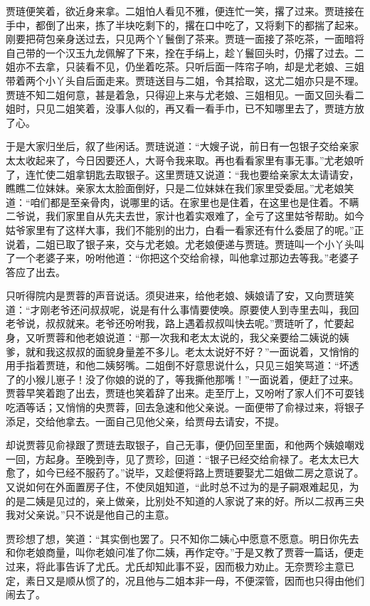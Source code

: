 \documentclass[12pt,oneside]{book}
\begin{document}
贾琏便笑着，欲近身来拿。二姐怕人看见不雅，便连忙一笑，撂了过来。贾琏接在手中，都倒了出来，拣了半块吃剩下的，撂在口中吃了，又将剩下的都揣了起来。刚要把荷包亲身送过去，只见两个丫鬟倒了茶来。贾琏一面接了茶吃茶，一面暗将自己带的一个汉玉九龙佩解了下来，拴在手绢上，趁丫鬟回头时，仍撂了过去。二姐亦不去拿，只装看不见，仍坐着吃茶。只听后面一阵帘子响，却是尤老娘、三姐带着两个小丫头自后面走来。贾琏送目与二姐，令其拾取，这尤二姐亦只是不理。贾琏不知二姐何意，甚是着急，只得迎上来与尤老娘、三姐相见。一面又回头看二姐时，只见二姐笑着，没事人似的，再又看一看手巾，已不知哪里去了，贾琏方放了心。

于是大家归坐后，叙了些闲话。贾琏说道：“大嫂子说，前日有一包银子交给亲家太太收起来了，今日因要还人，大哥令我来取。再也看看家里有事无事。”尤老娘听了，连忙使二姐拿钥匙去取银子。这里贾琏又说道：“我也要给亲家太太请请安，瞧瞧二位妹妹。亲家太太脸面倒好，只是二位妹妹在我们家里受委屈。”尤老娘笑道：“咱们都是至亲骨肉，说哪里的话。在家里也是住着，在这里也是住着。不瞒二爷说，我们家里自从先夫去世，家计也着实艰难了，全亏了这里姑爷帮助。如今姑爷家里有了这样大事，我们不能别的出力，白看一看家还有什么委屈了的呢。”正说着，二姐已取了银子来，交与尤老娘。尤老娘便递与贾琏。贾琏叫一个小丫头叫了一个老婆子来，吩咐他道：“你把这个交给俞禄，叫他拿过那边去等我。”老婆子答应了出去。

只听得院内是贾蓉的声音说话。须臾进来，给他老娘、姨娘请了安，又向贾琏笑道：“才刚老爷还问叔叔呢，说是有什么事情要使唤。原要使人到寺里去叫，我回老爷说，叔叔就来。老爷还吩咐我，路上遇着叔叔叫快去呢。”贾琏听了，忙要起身，又听贾蓉和他老娘说道：“那一次我和老太太说的，我父亲要给二姨说的姨爹，就和我这叔叔的面貌身量差不多儿。老太太说好不好？”一面说着，又悄悄的用手指着贾琏，和他二姨努嘴。二姐倒不好意思说什么，只见三姐笑骂道：“坏透了的小猴儿崽子！没了你娘的说的了，等我撕他那嘴！”一面说着，便赶了过来。贾蓉早笑着跑了出去，贾琏也笑着辞了出来。走至厅上，又吩咐了家人们不可耍钱吃酒等话；又悄悄的央贾蓉，回去急速和他父亲说。一面便带了俞禄过来，将银子添足，交给他拿去。一面自己见他父亲，给贾母去请安，不提。

却说贾蓉见俞禄跟了贾琏去取银子，自己无事，便仍回至里面，和他两个姨娘嘲戏一回，方起身。至晚到寺，见了贾珍，回道：“银子已经交给俞禄了。老太太已大愈了，如今已经不服药了。”说毕，又趁便将路上贾琏要娶尤二姐做二房之意说了。又说如何在外面置房子住，不使凤姐知道，“此时总不过为的是子嗣艰难起见，为的是二姨是见过的，亲上做亲，比别处不知道的人家说了来的好。所以二叔再三央我对父亲说。”只不说是他自己的主意。

贾珍想了想，笑道：“其实倒也罢了。只不知你二姨心中愿意不愿意。明日你先去和你老娘商量，叫你老娘问准了你二姨，再作定夺。”于是又教了贾蓉一篇话，便走过来，将此事告诉了尤氏。尤氏却知此事不妥，因而极力劝止。无奈贾珍主意已定，素日又是顺从惯了的，况且他与二姐本非一母，不便深管，因而也只得由他们闹去了。
\end{document}
